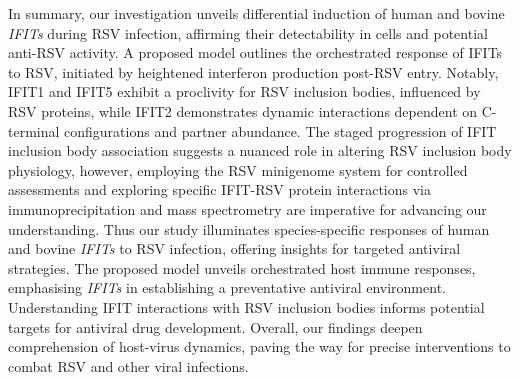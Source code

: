 In summary, our investigation unveils differential induction of human and bovine \textit{IFITs} during RSV infection, affirming their detectability in cells and potential anti-RSV activity. A proposed model outlines the orchestrated response of IFITs to RSV, initiated by heightened interferon production post-RSV entry. Notably, IFIT1 and IFIT5 exhibit a proclivity for RSV inclusion bodies, influenced by RSV proteins, while IFIT2 demonstrates dynamic interactions dependent on C-terminal configurations and partner abundance. The staged progression of IFIT inclusion body association suggests a nuanced role in altering RSV inclusion body physiology, however, employing the RSV minigenome system for controlled assessments and exploring specific IFIT-RSV protein interactions via immunoprecipitation and mass spectrometry are imperative for advancing our understanding. Thus our study illuminates species-specific responses of human and bovine \textit{IFITs} to RSV infection, offering insights for targeted antiviral strategies. The proposed model unveils orchestrated host immune responses, emphasising \textit{IFITs} in establishing a preventative antiviral environment. Understanding IFIT interactions with RSV inclusion bodies informs potential targets for antiviral drug development. Overall, our findings deepen comprehension of host-virus dynamics, paving the way for precise interventions to combat RSV and other viral infections.

